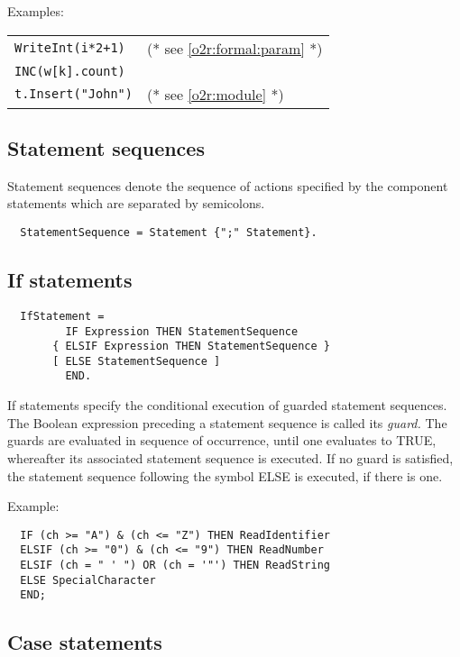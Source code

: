 \noindent
Examples:
\begin{flushleft}
\begin{tabular}{ll}
\verb|WriteInt(i*2+1)|          & (* see \ref{o2r:formal:param} *) \\
\verb|INC(w[k].count)|                                         \\
\verb|t.Insert("John")|         & (* see \ref{o2r:module} *)   \\
\end{tabular}
\end{flushleft}

\subsection{Statement sequences}

Statement sequences denote the sequence of actions specified by the
component statements which are separated by semicolons.
{\BNFsize
\begin{verbatim}
  StatementSequence = Statement {";" Statement}.
\end{verbatim}}

\subsection{If statements}
{\BNFsize
\begin{verbatim}
  IfStatement =
         IF Expression THEN StatementSequence
       { ELSIF Expression THEN StatementSequence }
       [ ELSE StatementSequence ]
         END.
\end{verbatim}}
If statements specify the conditional execution of guarded
statement sequences. The Boolean expression preceding a statement
sequence is called its {\em guard.} The guards are evaluated in sequence
of occurrence, until one evaluates to TRUE, whereafter its associated
statement sequence is executed. If no guard is satisfied, the statement
sequence following the symbol ELSE is executed, if there is one.

\noindent
Example:
\begin{verbatim}
  IF (ch >= "A") & (ch <= "Z") THEN ReadIdentifier
  ELSIF (ch >= "0") & (ch <= "9") THEN ReadNumber
  ELSIF (ch = " ' ") OR (ch = '"') THEN ReadString
  ELSE SpecialCharacter
  END;
\end{verbatim}

\subsection{Case statements}

